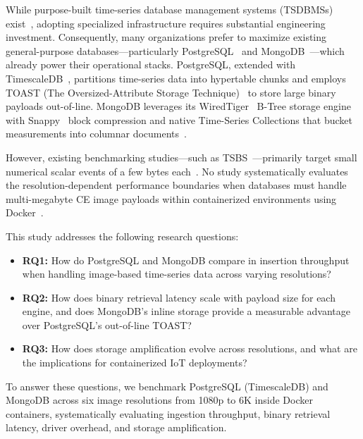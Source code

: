 \documentclass[conference]{IEEEtran}
\begin{document}
While purpose-built time-series database management systems (TSDBMSs) exist~\cite{dewaal_timeseries_survey,tigerdata_tsdb_compare}, adopting specialized infrastructure requires substantial engineering investment. Consequently, many organizations prefer to maximize existing general-purpose databases---particularly PostgreSQL~\cite{postgresql_official} and MongoDB~\cite{mongodb_official}---which already power their operational stacks. PostgreSQL, extended with TimescaleDB~\cite{timescaledb_official}, partitions time-series data into hypertable chunks and employs TOAST (The Oversized-Attribute Storage Technique)~\cite{postgresql_toast_docs} to store large binary payloads out-of-line. MongoDB leverages its WiredTiger~\cite{mongodb_wiredtiger_storage} B-Tree storage engine with Snappy~\cite{google_snappy} block compression and native Time-Series Collections that bucket measurements into columnar documents~\cite{influxdata_mongodb_timescaledb,tigerdata_mongodb_timescaledb}.

However, existing benchmarking studies---such as TSBS~\cite{tsbs}---primarily target small numerical scalar events of a few bytes each~\cite{tsbs,cratedb_ts_benchmark,diva_timescaledb_mongodb_eval}. No study systematically evaluates the resolution-dependent performance boundaries when databases must handle multi-megabyte CE image payloads within containerized environments using Docker~\cite{docker_official}.

This study addresses the following research questions:
\begin{itemize}
    \item \textbf{RQ1:} How do PostgreSQL and MongoDB compare in insertion throughput when handling image-based time-series data across varying resolutions?
    \item \textbf{RQ2:} How does binary retrieval latency scale with payload size for each engine, and does MongoDB's inline storage provide a measurable advantage over PostgreSQL's out-of-line TOAST?
    \item \textbf{RQ3:} How does storage amplification evolve across resolutions, and what are the implications for containerized IoT deployments?
\end{itemize}

To answer these questions, we benchmark PostgreSQL (TimescaleDB) and MongoDB across six image resolutions from 1080p to 6K inside Docker containers, systematically evaluating ingestion throughput, binary retrieval latency, driver overhead, and storage amplification.
\end{document}
